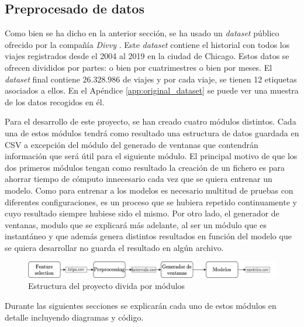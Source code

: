 \subsection{Preprocesado de datos}

Como bien se ha dicho en la anterior sección, se ha usado un \textit{dataset} público ofrecido por la compañía \textit{Divvy} \cite{divvy}. Este \textit{dataset} contiene el historial con todos los viajes registrados desde el 2004 al 2019 en la ciudad de Chicago. Estos datos se ofrecen divididos por partes: o bien por cuatrimestres o bien por meses. El \textit{dataset} final contiene $26.328.986$ de viajes y por cada viaje, se tienen 12 etiquetas asociados a ellos. En el Apéndice \ref{app:original_dataset} se puede ver una muestra de los datos recogidos en él.
\newline

Para el desarrollo de este proyecto, se han creado cuatro módulos distintos. Cada una de estos módulos tendrá como resultado una estructura de datos guardada en CSV a excepción del módulo del generado de ventanas que contendrán información que será útil para el siguiente módulo. El principal motivo de que los dos primeros módulos tengan como resultado la creación de un fichero es para ahorrar tiempo de cómputo innecesario cada vez que se quiera entrenar un modelo. Como para entrenar a los modelos es necesario multitud de pruebas con diferentes configuraciones, es un proceso que se hubiera repetido continuamente y cuyo resultado siempre hubiese sido el mismo. Por otro lado, el generador de ventanas, modulo que se explicará más adelante, al ser un módulo que es instantáneo y que además genera distintos resultados en función del modelo que se quiera desarrollar no guarda el resultado en algún archivo.


\begin{figure}[H]
    \centering
    \includegraphics[width=16cm]{images/solution/modules/modules.png}
    \caption{Estructura del proyecto divida por módulos}
\end{figure}

Durante las siguientes secciones se explicarán cada uno de estos módulos en detalle incluyendo diagramas y código.




